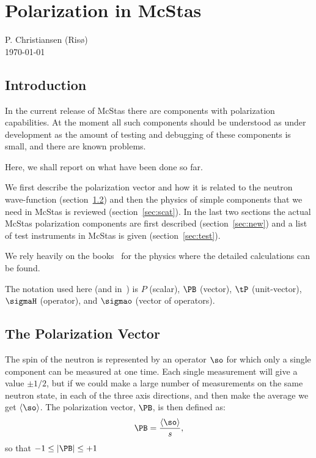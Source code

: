 
\chapter{Polarization in McStas}
\label{c:polarization}
\begin{center}
\Large{P. Christiansen (Ris{\o})\\\today}
\end{center}

\section{Introduction}

In the current release of McStas there are components with polarization
capabilities. At the moment all such components should be understood as under
development as the amount of testing and debugging of these components is
small, and there are known problems.

Here, we shall report on what have been done so far.

We first describe the polarization vector and how it is related to the neutron
wave-function (section~\ref{sec:pol}) and then the physics of simple
components that we need in McStas is reviewed (section~\ref{sec:scat}). In the
last two sections the actual McStas polarization components are first
described (section~\ref{sec:new}) and a list of test instruments in McStas is
given (section~\ref{sec:test}).

We rely heavily on the books~\cite{lovesey84,gavin} for the physics where
the detailed calculations can be found.

The notation used here (and in~\cite{gavin}) is $P$ (scalar), $\PB$
(vector), $\tP$ (unit-vector), $\sigmaH$ (operator), and $\sigmao$
(vector of operators).

\section{The Polarization Vector}
\label{sec:pol}

The spin of the neutron is represented by an operator $\so$ for which only a
single component can be measured at one time. Each single measurement will
give a value $\pm 1/2$, but if we could make a large number of measurements on
the same neutron state, in each of the three axis directions, and then make
the average we get $\langle \so \rangle$. The polarization vector, $\PB$, is
then defined as:
\begin{equation}
  \label{eq:pol_single}
  \PB = \frac{\langle \so \rangle}{s},
\end{equation}
so that $-1 \leq |\PB| \leq +1$


